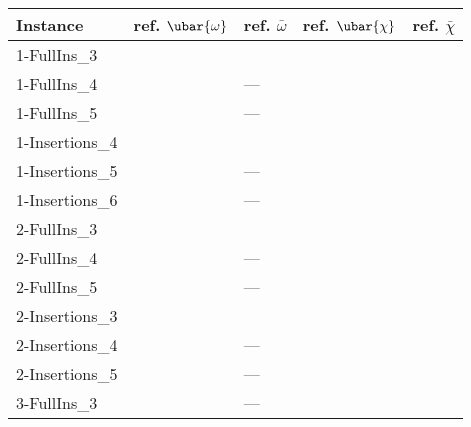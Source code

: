 \begingroup\footnotesize
\begin{longtable}{lllll}
  \toprule
  Instance & ref. $\ubar{\omega}$ & ref. $\bar{\omega}$ & ref. $\ubar{\chi}$ & ref. $\bar{\chi}$ \\ \midrule
1-FullIns\_3 & \cite{Gualandi2012} & \cite{Gualandi2012} & \cite{Gualandi2012} & \cite{Gualandi2012} \\ 
  1-FullIns\_4 & \cite{Malaguti2011} & --- & \cite{Mendez-Diaz2006} & \cite{Mendez-Diaz2006,Malaguti2011,Gualandi2012,Brelaz1979,Sewell1996,Segundo2012} \\ 
  1-FullIns\_5 & \cite{Malaguti2011} & --- & \cite{Malaguti2010} & \cite{Malaguti2010,Mendez-Diaz2006,Malaguti2011,Gualandi2012,Brelaz1979,Sewell1996,Segundo2012} \\ 
  1-Insertions\_4 & \cite{Malaguti2011,Gualandi2012} & \cite{Gualandi2012} & \cite{Mendez-Diaz2006,Malaguti2011,Gualandi2012} & \cite{Mendez-Diaz2006,Malaguti2011,Gualandi2012,Brelaz1979,Sewell1996,Segundo2012} \\ 
  1-Insertions\_5 & \cite{Malaguti2011} & --- & \cite{Malaguti2010} & \cite{Mendez-Diaz2006,Malaguti2011,Gualandi2012,Brelaz1979,Sewell1996,Segundo2012} \\ 
  1-Insertions\_6 & \cite{Malaguti2011,Held2011} & --- & \cite{Malaguti2010} & \cite{Mendez-Diaz2006,Malaguti2011,Gualandi2012} \\ 
  2-FullIns\_3 & \cite{Malaguti2011,Gualandi2012} & \cite{Gualandi2012} & \cite{Mendez-Diaz2006,Malaguti2011,Gualandi2012} & \cite{Mendez-Diaz2006,Malaguti2011,Gualandi2012,Brelaz1979,Sewell1996,Segundo2012} \\ 
  2-FullIns\_4 & \cite{us} & --- & \cite{Malaguti2010} & \cite{Malaguti2010,Mendez-Diaz2006,Malaguti2011,Gualandi2012,Brelaz1979,Sewell1996,Segundo2012} \\ 
  2-FullIns\_5 & \cite{us} & --- & \cite{Malaguti2010,Mendez-Diaz2006} & \cite{Malaguti2010,Mendez-Diaz2006,Gualandi2012,Brelaz1979,Sewell1996,Segundo2012} \\ 
  2-Insertions\_3 & \cite{Malaguti2011} & \cite{Gualandi2012} & \cite{Caramia,Gualandi2012} & \cite{Caramia,Gualandi2012} \\ 
  2-Insertions\_4 & \cite{Malaguti2011} & --- & \cite{Malaguti2010} & \cite{Malaguti2010} \\ 
  2-Insertions\_5 & \cite{Malaguti2011} & --- & \cite{Malaguti2010} & \cite{Malaguti2010} \\ 
  3-FullIns\_3 & \cite{Malaguti2011} & --- & \cite{Mendez-Diaz2006,Mendez-Diaz2008,Malaguti2011,Gualandi2012} & \cite{Mendez-Diaz2006,Malaguti2011,Gualandi2012,Mendez-Diaz2006,Brelaz1979,Sewell1996,Segundo2012} \\ 

\end{longtable}
